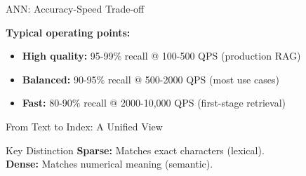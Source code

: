 \documentclass[aspectratio=169]{beamer}
\newif\ifanimated
\newcommand{\cpause}{\ifanimated\pause\fi}
\begin{document}
\begin{frame}[shrink=5]{ANN: Accuracy-Speed Trade-off}
\begin{center}

\end{center}

\vspace{0.5em}

\textbf{Typical operating points:}
\begin{itemize}
    \item \textbf{High quality:} 95-99\% recall @ 100-500 QPS (production RAG)
    \item \textbf{Balanced:} 90-95\% recall @ 500-2000 QPS (most use cases)
    \item \textbf{Fast:} 80-90\% recall @ 2000-10,000 QPS (first-stage retrieval)
\end{itemize}
\end{frame}

\begin{frame}{From Text to Index: A Unified View}
\begin{center}

\end{center}

\vspace{1em}
\begin{exampleblock}{Key Distinction}
\textbf{Sparse:} Matches exact characters (lexical). \\
\textbf{Dense:} Matches numerical meaning (semantic).
\end{exampleblock}
\cpause
\end{frame}
\end{document}
